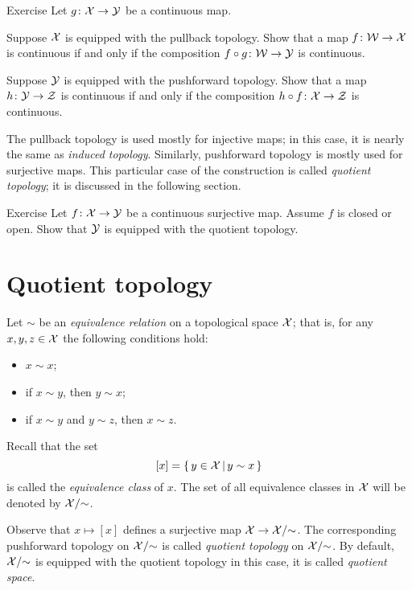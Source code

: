 \begin{thm}{Exercise}\label{ex:category-def-pull-push}
Let $g\colon\mathcal{X}\to\mathcal{Y}$ be a continuous map.

\begin{subthm}{}
Suppose $\mathcal{X}$ is equipped with the pullback topology.
Show that a map $f\colon\mathcal{W}\to\mathcal{X}$ is continuous if and only if the composition $f\circ g\colon\mathcal{W}\to\mathcal{Y}$ is continuous.
\end{subthm}

\begin{subthm}{}
Suppose $\mathcal{Y}$ is equipped with the pushforward topology.
Show that a map $h\colon\mathcal{Y}\to\mathcal{Z}$ is continuous if and only if the composition $h\circ f\colon\mathcal{X}\to\mathcal{Z}$ is continuous.
\end{subthm}

\end{thm}


The pullback topology is used mostly for injective maps; in this case, it is nearly the same as \emph{induced topology}.
Similarly, pushforward topology is mostly used for surjective maps.
This particular case of the construction is called \emph{quotient topology};
it is discussed in the following section.

\begin{thm}{Exercise}\label{ex:open-closed-pushforward}
Let $f\colon\mathcal{X}\to \mathcal{Y}$ be a continuous surjective map.
Assume $f$ is closed or open.
Show that $\mathcal{Y}$ is equipped with the quotient topology.
\end{thm}

\section{Quotient topology}

Let $\sim$ be an \emph{equivalence relation} on a topological space $\mathcal{X}$;
that is, for any $x,y,z\in\mathcal{X}$ the following conditions hold:
\begin{itemize}
 \item $x\sim x$;
 \item if $x\sim y$, then $y\sim x$;
 \item if $x\sim y$ and $y\sim z$, then $x\sim z$.
\end{itemize}

Recall that the set 
\[[x]=\left\{\,{y\in \mathcal{X}}\,\middle|\,{y\sim x}\,\right\}\]
is called the \emph{equivalence class} of $x$.
The set of all equivalence classes in $\mathcal{X}$ will be denoted by $\mathcal{X}/{\sim}$.

Observe that $x\mapsto [x]$ defines a surjective map $\mathcal{X}\to \mathcal{X}/{\sim}$.
The corresponding pushforward topology on $\mathcal{X}/{\sim}$ is called \emph{quotient topology} on $\mathcal{X}/{\sim}$.
By default, $\mathcal{X}/{\sim}$ is equipped with the quotient topology
in this case, it is called \emph{quotient space}.

